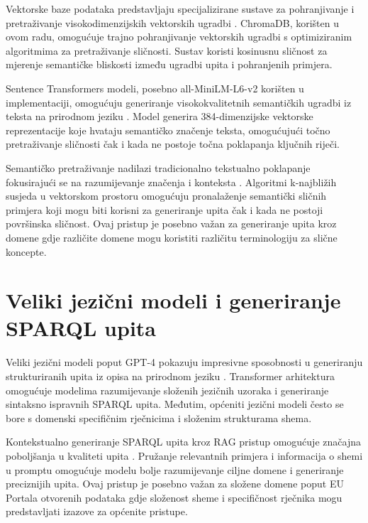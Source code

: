 Vektorske baze podataka predstavljaju specijalizirane sustave za pohranjivanje i pretraživanje visokodimenzijskih vektorskih ugradbi \cite{wang2023vector}. ChromaDB, korišten u ovom radu, omogućuje trajno pohranjivanje vektorskih ugradbi s optimiziranim algoritmima za pretraživanje sličnosti. Sustav koristi kosinusnu sličnost za mjerenje semantičke bliskosti između ugradbi upita i pohranjenih primjera.

Sentence Transformers modeli, posebno all-MiniLM-L6-v2 korišten u implementaciji, omogućuju generiranje visokokvalitetnih semantičkih ugradbi iz teksta na prirodnom jeziku \cite{reimers2019sentence}. Model generira 384-dimenzijske vektorske reprezentacije koje hvataju semantičko značenje teksta, omogućujući točno pretraživanje sličnosti čak i kada ne postoje točna poklapanja ključnih riječi.

Semantičko pretraživanje nadilazi tradicionalno tekstualno poklapanje fokusirajući se na razumijevanje značenja i konteksta \cite{zhang2022survey}. Algoritmi k-najbližih susjeda u vektorskom prostoru omogućuju pronalaženje semantički sličnih primjera koji mogu biti korisni za generiranje upita čak i kada ne postoji površinska sličnost. Ovaj pristup je posebno važan za generiranje upita kroz domene gdje različite domene mogu koristiti različitu terminologiju za slične koncepte.

\section{Veliki jezični modeli i generiranje SPARQL upita}
\label{sec:llm_sparql}

Veliki jezični modeli poput GPT-4 pokazuju impresivne sposobnosti u generiranju strukturiranih upita iz opisa na prirodnom jeziku \cite{brown2020language, devlin2018bert}. Transformer arhitektura omogućuje modelima razumijevanje složenih jezičnih uzoraka i generiranje sintaksno ispravnih SPARQL upita. Međutim, općeniti jezični modeli često se bore s domenski specifičnim rječnicima i složenim strukturama shema.

Kontekstualno generiranje SPARQL upita kroz RAG pristup omogućuje značajna poboljšanja u kvaliteti upita \cite{lewis2020retrieval}. Pružanje relevantnih primjera i informacija o shemi u promptu omogućuje modelu bolje razumijevanje ciljne domene i generiranje preciznijih upita. Ovaj pristup je posebno važan za složene domene poput EU Portala otvorenih podataka gdje složenost sheme i specifičnost rječnika mogu predstavljati izazove za općenite pristupe.

